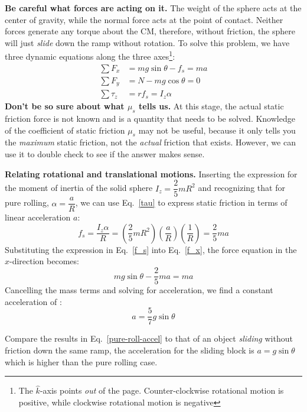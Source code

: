 \documentclass{../../oss-handout}
\newcommand{\kkk}{\hat k}}
\begin{document}
\textbf{Be careful what forces are acting on it.} The weight of the sphere acts
at the center of gravity, while the normal force acts at the point of contact.
Neither forces generate any torque about the CM, therefore, without friction,
the sphere will just \emph{slide} down the ramp without rotation. To solve this
problem, we have three dynamic equations along the three
axes\footnote{The $\kkk$-axis points \emph{out} of the page. Counter-clockwise
  rotational motion is positive, while clockwise rotational motion is negative}:
\begin{align}
  \sum F_x&=mg\sin\theta-f_s=ma\\ \label{f_x}
  \sum F_y&=N-mg\cos\theta=0\\
  \sum\tau_z&=rf_s=I_z\alpha \label{tau}
\end{align}
\textbf{Don't be so sure about what $\mu_s$ tells us.} At this stage, the
actual static friction force is not known and is a quantity that needs to be
solved. Knowledge of the coefficient of static friction $\mu_s$ may not be
useful, because it only tells you the \emph{maximum} static friction, not the
\emph{actual} friction that exists. However, we can use it to double check to
see if the answer makes sense.

\textbf{Relating rotational and translational motions.} Inserting the
expression for the moment of inertia of the solid sphere $I_z=\dfrac25 mR^2$
and recognizing that for pure rolling, $\alpha=\dfrac aR$, we can use
Eq.~\ref{tau} to express static friction in terms of linear acceleration $a$:
\begin{equation}
  f_s=\frac{I_z\alpha}{R}=
  \left(\frac25 mR^2\right)
  \left(\frac{a}{R}\right)
  \left(\frac{1}{R}\right)=\frac25ma
  \label{f_s}
\end{equation}
Substituting the expression in Eq.~\ref{f_s} into Eq.~\ref{f_x}, the force
equation in the $x$-direction becomes:
\begin{equation}
  mg\sin\theta-\frac25 ma=ma
\end{equation}
Cancelling the mass terms and solving for acceleration, we find a constant
acceleration of :
\begin{equation}
  a=\frac57 g\sin\theta
  \label{pure-roll-accel}
\end{equation}

Compare the results in Eq.~\ref{pure-roll-accel} to that of an object
\emph{sliding} without friction down the same ramp, the acceleration for the
sliding block is $a=g\sin\theta$ which is higher than the pure rolling case.
\end{document}
